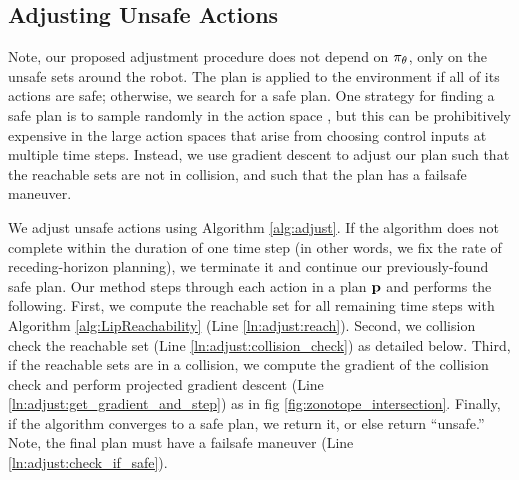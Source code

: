 \subsection{Adjusting Unsafe Actions}

Note, our proposed adjustment procedure does not depend on $\pi_\theta$, only on the unsafe sets around the robot.
The plan is applied to the environment if all of its actions are safe; otherwise, we search for a safe plan.
One strategy for finding a safe plan is to sample randomly in the action space \cite{conf:modelBasedReachRL}, but this can be prohibitively expensive in the large action spaces that arise from choosing control inputs at multiple time steps.
Instead, we use gradient descent to adjust  our plan such that the reachable sets are not in collision, and such that the plan has a failsafe maneuver.

We adjust unsafe actions using Algorithm \ref{alg:adjust}.
If the algorithm does not complete within the duration of one time step (in other words, we fix the rate of receding-horizon planning), we terminate it and continue our previously-found safe plan.
Our method steps through each action in a plan ${\mathbf{p}}$ and performs the following.
First, we compute the reachable set for all remaining time steps with Algorithm \ref{alg:LipReachability} (Line \ref{ln:adjust:reach}).
Second, we collision check the reachable set (Line \ref{ln:adjust:collision_check}) as detailed below.
Third, if the reachable sets are in a collision, we compute the gradient of the collision check and perform projected gradient descent (Line \ref{ln:adjust:get_gradient_and_step}) as in fig \ref{fig:zonotope_intersection}.
Finally, if the algorithm converges to a safe plan, we return it, or else return ``unsafe.''
Note, the final plan must have a failsafe maneuver (Line \ref{ln:adjust:check_if_safe}).


